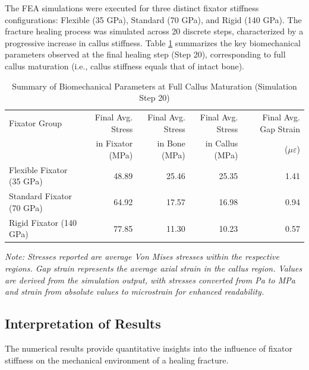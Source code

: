 \documentclass{article}
\begin{document}
The FEA simulations were executed for three distinct fixator stiffness configurations: Flexible (35 GPa), Standard (70 GPa), and Rigid (140 GPa). The fracture healing process was simulated across 20 discrete steps, characterized by a progressive increase in callus stiffness. Table \ref{tab:final_results} summarizes the key biomechanical parameters observed at the final healing step (Step 20), corresponding to full callus maturation (i.e., callus stiffness equals that of intact bone).

\begin{table}[h!]
  \centering
  \caption{Summary of Biomechanical Parameters at Full Callus Maturation (Simulation Step 20)}
  \label{tab:final_results}
  \begin{tabular}{lrrrr}
    \toprule
    Fixator Group              & Final Avg. Stress & Final Avg. Stress & Final Avg. Stress & Final Avg. Gap Strain \\
                               & in Fixator (MPa)  & in Bone (MPa)     & in Callus (MPa)   & ($\mu\varepsilon$)    \\
    \midrule
    Flexible Fixator (35 GPa)  & 48.89             & 25.46             & 25.35             & 1.41                  \\
    Standard Fixator (70 GPa)  & 64.92             & 17.57             & 16.98             & 0.94                  \\
    Rigid Fixator    (140 GPa) & 77.85             & 11.30             & 10.23             & 0.57                  \\
    \bottomrule
  \end{tabular}

  \vspace{0.5em}
  \footnotesize{\textit{Note: Stresses reported are average Von Mises stresses within the respective regions. Gap strain represents the average axial strain in the callus region. Values are derived from the simulation output, with stresses converted from Pa to MPa and strain from absolute values to microstrain for enhanced readability.}}
\end{table}

\subsection{Interpretation of Results}

The numerical results provide quantitative insights into the influence of fixator stiffness on the mechanical environment of a healing fracture.
\end{document}
